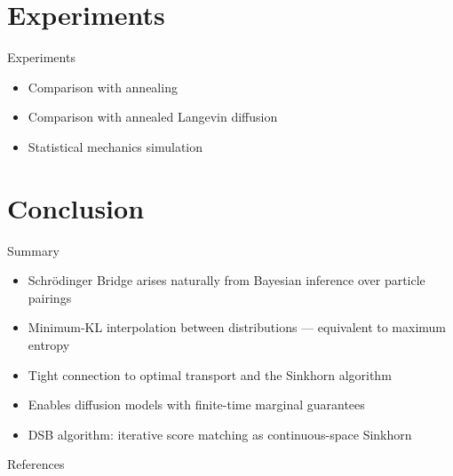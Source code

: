 \documentclass{beamer}
\begin{document}
\section{Experiments}

\begin{frame}{Experiments}
  \begin{itemize}
    \item Comparison with annealing
    \item Comparison with annealed Langevin diffusion
    \item Statistical mechanics simulation
  \end{itemize}
\end{frame}

\section{Conclusion}

\begin{frame}{Summary}
  \begin{itemize}
    \item Schrödinger Bridge arises naturally from Bayesian inference over particle pairings
    \item Minimum-KL interpolation between distributions — equivalent to maximum entropy
    \item Tight connection to optimal transport and the Sinkhorn algorithm
    \item Enables diffusion models with finite-time marginal guarantees
    \item DSB algorithm: iterative score matching as continuous-space Sinkhorn
  \end{itemize}
\end{frame}

\begin{frame}[allowframebreaks]{References}
  
  
\end{frame}
\end{document}
